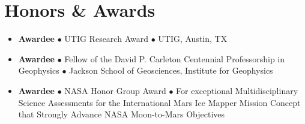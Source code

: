 \section*{Honors \& Awards}

\begin{itemize}[leftmargin=3.8em, labelsep=1.5em]
    \setlength\itemsep{-.5em}
    
    \item[\texttt{2025}] \textbf{Awardee} $\bullet$ UTIG Research Award $\bullet$ UTIG, Austin, TX

    \item[\texttt{2024}] \textbf{Awardee} $\bullet$ Fellow of the David P. Carleton
Centennial Professorship in Geophysics $\bullet$ Jackson School of Geosciences, Institute for Geophysics
    
    \item[\texttt{2024}] \textbf{Awardee} $\bullet$ NASA Honor Group Award $\bullet$ For exceptional Multidisciplinary Science Assessments for the International Mars Ice Mapper Mission Concept that Strongly Advance NASA Moon-to-Mars Objectives
    

\end{itemize}
